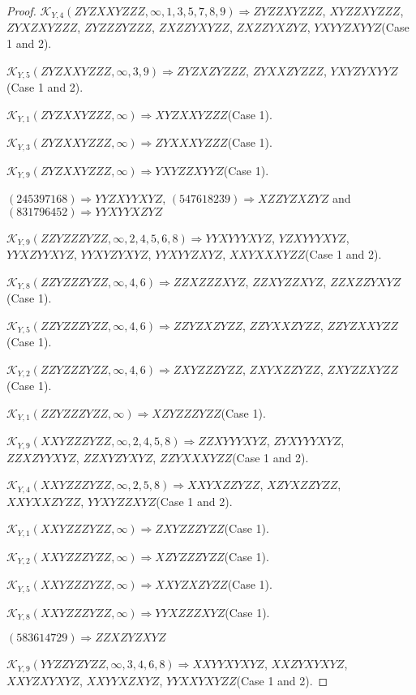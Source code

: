 \documentclass[12pt]{article}
\theoremstyle{plain}
\theoremstyle{definition}
\theoremstyle{remark}
\newcommand{\fancy}[1]{\mathcal{#1}}
\def\K{\fancy{K}}
\begin{document}
\begin{proof}
	
	$\K_{Y,4}(ZYZXXYZZZ,\infty,1, 3, 5, 7, 8, 9)\Rightarrow $$ZYZZXYZZZ$, $XYZZXYZZZ$, $ZYXZXYZZZ$, $ZYZZZYZZZ$, $ZXZZYXYZZ$, $ZXZZYXZYZ$, $YXYYZXYYZ$(Case 1 and 2).
	
	$\K_{Y,5}(ZYZXXYZZZ,\infty,3, 9)\Rightarrow $$ZYZXZYZZZ$, $ZYXXZYZZZ$, $YXYZYXYYZ$(Case 1 and 2).
	
	$\K_{Y,1}(ZYZXXYZZZ,\infty)\Rightarrow $$XYZXXYZZZ$(Case 1).
	
	$\K_{Y,3}(ZYZXXYZZZ,\infty)\Rightarrow $$ZYXXXYZZZ$(Case 1).
	
	$\K_{Y,9}(ZYZXXYZZZ,\infty)\Rightarrow $$YXYZZXYYZ$(Case 1).
	
	
	
	$(2 4 5 3 9 7 1 6 8)\Rightarrow YYZXYYXYZ$, $(5 4 7 6 1 8 2 3 9)\Rightarrow XZZYZXZYZ$ and $(8 3 1 7 9 6 4 5 2)\Rightarrow YYXYYXZYZ$
	
	
	$\K_{Y,9}(ZZYZZZYZZ,\infty,2, 4, 5, 6, 8)\Rightarrow $$YYXYYYXYZ$, $YZXYYYXYZ$, $YYXZYYXYZ$, $YYXYZYXYZ$, $YYXYYZXYZ$, $XXYXXXYZZ$(Case 1 and 2).
	
	$\K_{Y,8}(ZZYZZZYZZ,\infty,4, 6)\Rightarrow $$ZZXZZZXYZ$, $ZZXYZZXYZ$, $ZZXZZYXYZ$(Case 1).
	
	$\K_{Y,5}(ZZYZZZYZZ,\infty,4, 6)\Rightarrow $$ZZYZXZYZZ$, $ZZYXXZYZZ$, $ZZYZXXYZZ$(Case 1).
	
	$\K_{Y,2}(ZZYZZZYZZ,\infty,4, 6)\Rightarrow $$ZXYZZZYZZ$, $ZXYXZZYZZ$, $ZXYZZXYZZ$(Case 1).
	
	$\K_{Y,1}(ZZYZZZYZZ,\infty)\Rightarrow $$XZYZZZYZZ$(Case 1).
	
	$\K_{Y,9}(XXYZZZYZZ,\infty,2, 4, 5, 8)\Rightarrow $$ZZXYYYXYZ$, $ZYXYYYXYZ$, $ZZXZYYXYZ$, $ZZXYZYXYZ$, $ZZYXXXYZZ$(Case 1 and 2).
	
	$\K_{Y,4}(XXYZZZYZZ,\infty,2, 5, 8)\Rightarrow $$XXYXZZYZZ$, $XZYXZZYZZ$, $XXYXXZYZZ$, $YYXYZZXYZ$(Case 1 and 2).
	
	$\K_{Y,1}(XXYZZZYZZ,\infty)\Rightarrow $$ZXYZZZYZZ$(Case 1).
	
	$\K_{Y,2}(XXYZZZYZZ,\infty)\Rightarrow $$XZYZZZYZZ$(Case 1).
	
	$\K_{Y,5}(XXYZZZYZZ,\infty)\Rightarrow $$XXYZXZYZZ$(Case 1).
	
	$\K_{Y,8}(XXYZZZYZZ,\infty)\Rightarrow $$YYXZZZXYZ$(Case 1).
	
	
	
	$(5 8 3 6 1 4 7 2 9)\Rightarrow ZZXZYZXYZ$
	
	
	$\K_{Y,9}(YYZZYZYZZ,\infty,3, 4, 6, 8)\Rightarrow $$XXYYXYXYZ$, $XXZYXYXYZ$, $XXYZXYXYZ$, $XXYYXZXYZ$, $YYXXYXYZZ$(Case 1 and 2).
	

\end{proof}
\end{document}
